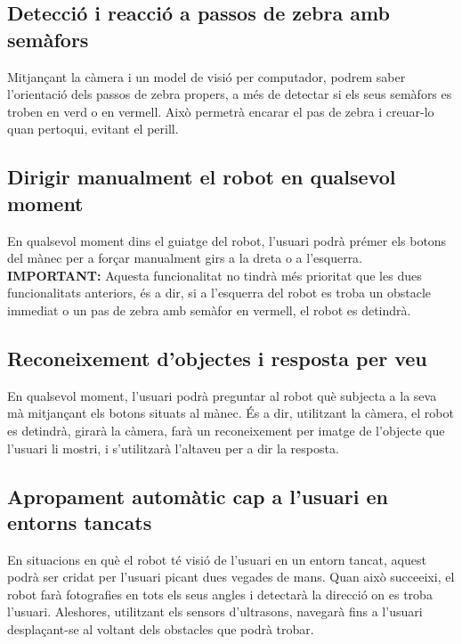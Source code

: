 \documentclass[11pt]{article}
\begin{document}
	\hypertarget{sec:b}{}
	\subsection*{Detecció i reacció a passos de zebra amb semàfors}
	Mitjançant la càmera i un model de visió per computador, podrem saber l'orientació dels passos de zebra propers, a més de detectar si els seus semàfors es troben en verd o en vermell. Això permetrà encarar el pas de zebra i creuar-lo quan pertoqui, evitant el perill.
	
	\hypertarget{sec:c}{}
	\subsection*{Dirigir manualment el robot en qualsevol moment}
	En qualsevol moment dins el guiatge del robot, l'usuari podrà prémer els botons del mànec per a forçar manualment girs a la dreta o a l'esquerra. \textbf{IMPORTANT:} Aquesta funcionalitat no tindrà més prioritat que les dues funcionalitats anteriors, és a dir, si a l'esquerra del robot es troba un obstacle immediat o un pas de zebra amb semàfor en vermell, el robot es detindrà.
	
	\hypertarget{sec:d}{}
	\subsection*{Reconeixement d'objectes i resposta per veu}
	En qualsevol moment, l'usuari podrà preguntar al robot què subjecta a la seva mà mitjançant els botons situats al mànec. És a dir, utilitzant la càmera, el robot es detindrà, girarà la càmera, farà un reconeixement per imatge de l'objecte que l'usuari li mostri, i s'utilitzarà l'altaveu per a dir la resposta. 
	
	\hypertarget{sec:e}{}
	\subsection*{Apropament automàtic cap a l'usuari en entorns tancats}
	En situacions en què el robot té visió de l'usuari en un entorn tancat, aquest podrà ser cridat per l'usuari picant dues vegades de mans. Quan això succeeixi, el robot farà fotografies en tots els seus angles i detectarà la direcció on es troba l'usuari. Aleshores, utilitzant els sensors d'ultrasons, navegarà fins a l'usuari desplaçant-se al voltant dels obstacles que podrà trobar.
	
\end{document}
